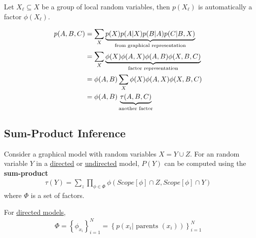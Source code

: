\documentclass{article}
\begin{document}
	\begin{remark}
		Let $X_\ell \subseteq X$ be a group of local random variables, then $p(X_\ell)$ is automatically a factor $\phi(X_\ell)$.
	\end{remark}

	\begin{align}
		p(A, B, C) &=\sum_{X} \underbrace{p(X) p(A | X) p(B | A) p(C | B, X)}_{\text{{from graphical representation}}} \\
		&=\sum_{X} \underbrace{\phi(X) \phi(A, X) \phi(A, B) \phi(X, B, C)}_{\text{{factor representation}}} \\
		&=\phi(A, B) \sum_{X} \phi(X) \phi(A, X) \phi(X, B, C) \\
		&=\phi(A, B) \underbrace{\tau(A, B, C)}_{\text{{another factor}}}
	\end{align}
	
	\subsection{Sum-Product Inference}
	\begin{theorem}
		Consider a graphical model with random variables $X = Y \cup Z$.
		For an random variable $Y$ in a \ul{directed} or \ul{undirected} model, $P(Y)$ can be computed using the \textbf{sum-product}
		\begin{align}
			\tau(Y) = \sum_z \prod_{\phi \in \Phi} \phi({Scope[\phi]\cap Z}, {Scope[\phi] \cap Y})
		\end{align}
		where $\Phi$ is a set of factors.
	\end{theorem}
	
	\begin{remark}
		For \ul{directed models},
		\begin{align}
			\Phi=\left\{\phi_{x_{i}}\right\}_{i=1}^{N}=\left\{p\left(x_{i} | \text { parents }\left(x_{i}\right)\right)\right\}_{i=1}^{N}
		\end{align}
	\end{remark}
	
	
\end{document}
